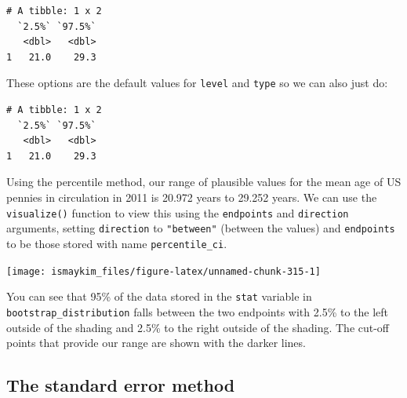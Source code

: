 \documentclass[12pt,]{krantz}
\makeatletter
\newenvironment{Shaded}{\begin{snugshade}}{\end{snugshade}}
\newcommand{\KeywordTok}[1]{\textcolor[rgb]{0.27,0.27,0.27}{\textbf{#1}}}
\newcommand{\DataTypeTok}[1]{\textcolor[rgb]{0.27,0.27,0.27}{#1}}
\newcommand{\StringTok}[1]{\textcolor[rgb]{0.5,0.5,0.5}{#1}}
\newcommand{\OperatorTok}[1]{\textcolor[rgb]{0.43,0.43,0.43}{\textbf{#1}}}
\newcommand{\NormalTok}[1]{#1}
\newenvironment{kframe}{%
\medskip{}
\setlength{\fboxsep}{.8em}
 \def\at@end@of@kframe{}%
 \ifinner\ifhmode%
  \def\at@end@of@kframe{\end{minipage}}%
  \begin{minipage}{\columnwidth}%
 \fi\fi%
 \def\FrameCommand##1{\hskip\@totalleftmargin \hskip-\fboxsep
 \colorbox{shadecolor}{##1}\hskip-\fboxsep
     \hskip-\linewidth \hskip-\@totalleftmargin \hskip\columnwidth}%
 \MakeFramed {\advance\hsize-\width
   \@totalleftmargin\z@ \linewidth\hsize
   \@setminipage}}%
 {\par\unskip\endMakeFramed%
 \at@end@of@kframe}
\renewenvironment{Shaded}{\begin{kframe}}{\end{kframe}}
\theoremstyle{definition}
\theoremstyle{definition}
\theoremstyle{definition}
\theoremstyle{remark}
\makeatother
\begin{document}
\begin{verbatim}
# A tibble: 1 x 2
  `2.5%` `97.5%`
   <dbl>   <dbl>
1   21.0    29.3
\end{verbatim}

These options are the default values for \texttt{level} and
\texttt{type} so we can also just do:

\begin{Shaded}
\end{Shaded}

\begin{verbatim}
# A tibble: 1 x 2
  `2.5%` `97.5%`
   <dbl>   <dbl>
1   21.0    29.3
\end{verbatim}

Using the percentile method, our range of plausible values for the mean
age of US pennies in circulation in 2011 is 20.972 years to 29.252
years. We can use the \texttt{visualize()} function to view this using
the \texttt{endpoints} and \texttt{direction} arguments, setting
\texttt{direction} to \texttt{"between"} (between the values) and
\texttt{endpoints} to be those stored with name \texttt{percentile\_ci}.

\begin{Shaded}
\end{Shaded}

\begin{center}\texttt{[image: ismaykim\_files/figure-latex/unnamed-chunk-315-1]} \end{center}

You can see that 95\% of the data stored in the \texttt{stat} variable
in \texttt{bootstrap\_distribution} falls between the two endpoints with
2.5\% to the left outside of the shading and 2.5\% to the right outside
of the shading. The cut-off points that provide our range are shown with
the darker lines.

\subsection{The standard error method}\label{the-standard-error-method}
\end{document}
